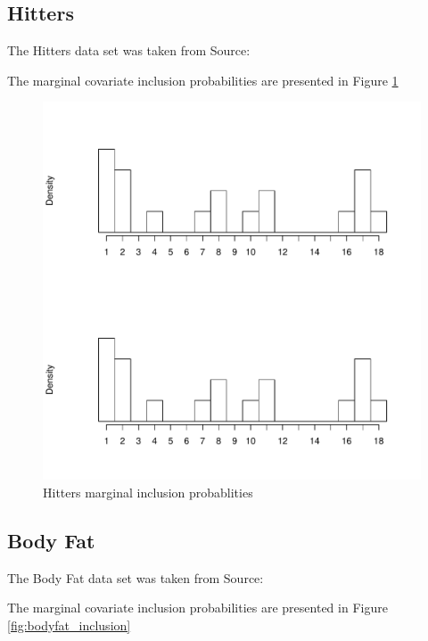\documentclass{amsart}[12pt]
\begin{document}
\subsection{Hitters}

The Hitters data set was taken from Source: \cite{James:2014:ISL:2517747}

The marginal covariate inclusion probabilities are presented in Figure \ref{fig:Hitters_inclusion}

\begin{figure}[p]
\label{fig:Hitters_inclusion}
\caption{Hitters marginal inclusion probablities}
\includegraphics[scale=.4]{Hitters_histogram.pdf}
\end{figure}

\subsection{Body Fat}
The Body Fat data set was taken from Source: \cite{James:2014:ISL:2517747}

The marginal covariate inclusion probabilities are presented in Figure \ref{fig:bodyfat_inclusion}

\end{document}
